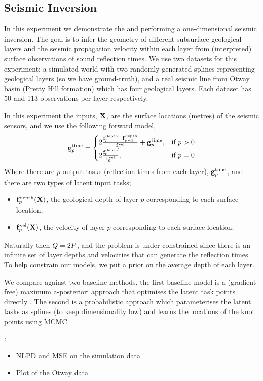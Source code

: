 \subsection{Seismic Inversion}

In this experiment we demonstrate the \eks and \uks performing a
one-dimensional seismic inversion. The goal is to infer the geometry of
different subsurface geological layers and the seismic propagation velocity
within each layer from (interpreted) surface observations of sound reflection
times. We use two datasets for this experiment; a simulated world with two
randomly generated splines representing geological layers (so we have
ground-truth), and a real seismic line from Otway basin (Pretty Hill formation)
which has four geological layers. Each dataset has 50 and 113 observations per
layer respectively.

In this experiment the inputs, $\mathbf{X}$, are the surface locations (metres) of
the seismic sensors, and we use the following forward model,
\begin{equation}
    \mathbf{g}_p^\text{time} =
    \begin{cases}
        2\frac{\mathbf{f}_p^\text{depth} - \mathbf{f}_{p-1}^\text{depth}}
        {\mathbf{f}_p^\text{vel}} + \mathbf{g}_{p-1}^\text{time},
        & \text{if } p > 0 \\
        2\frac{\mathbf{f}_0^\text{depth}}{\mathbf{f}_0^\text{vel}},
        & \text{if } p = 0
    \end{cases}
\end{equation}
Where there are $p$ output tasks (reflection times from each layer),
$\mathbf{g}_p^\text{time}$, and there are two types of latent input tasks;
\begin{itemize}
    \item $\mathbf{f}_p^\text{depth}\!\left({\mathbf{X}}\right)$, the geological depth of layer $p$
        corresponding to each surface location,
    \item $\mathbf{f}_p^\text{vel}\!\left({\mathbf{X}}\right)$, the velocity of layer $p$ 
        corresponding to each surface location.
\end{itemize}
Naturally then $Q = 2P$, and the problem is under-constrained since
there is an infinite set of layer depths and velocities that can generate the
reflection times. To help constrain our models, we put a prior on the average
depth of each layer.

We compare against two baseline methods, the first baseline model is a
(gradient free) maximum a-posteriori approach that optimises the latent task
points directly . The second is a
probabilistic approach which parameterises the latent tasks as splines (to keep
dimensionality low) and learns the locations of the knot points using MCMC

:
\begin{itemize}
    \item NLPD and MSE on the simulation data
    \item Plot of the Otway data
\end{itemize}
